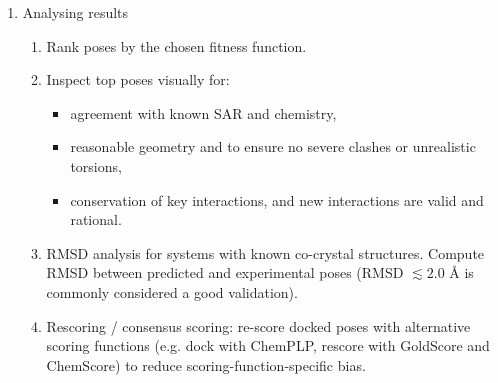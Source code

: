 \documentclass[12pt, a4paper]{article}
\begin{document}
\begin{enumerate}
\item Analysing results
\begin{enumerate}
    \item Rank poses by the chosen fitness function.
    \item Inspect top poses visually for:
    \begin{itemize}
        \item agreement with known SAR and chemistry,
        \item reasonable geometry and to ensure no severe clashes or unrealistic torsions,
        \item conservation of key interactions, and new interactions are valid and rational.
    \end{itemize}
    \item RMSD analysis for systems with known co-crystal structures. Compute RMSD between predicted and experimental poses (RMSD $\lesssim 2.0$ \r{A} is commonly considered a good validation).\cite{CH7_Jones1997}
    \item Rescoring / consensus scoring: re-score docked poses with alternative scoring functions (e.g. dock with ChemPLP, rescore with GoldScore and ChemScore) to reduce scoring-function-specific bias.\cite{CH7_Verdonk2003}
\end{enumerate}
\end{enumerate}






\end{document}
